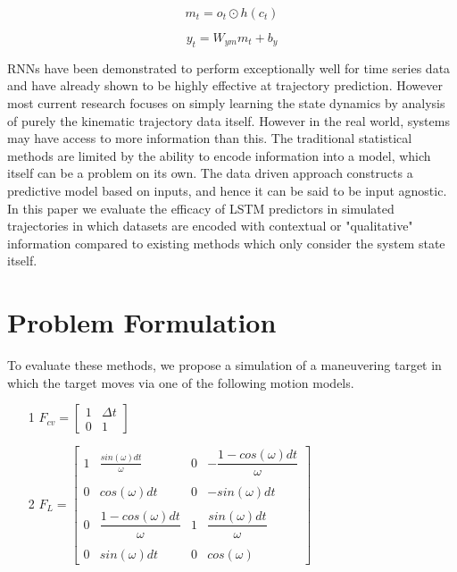 \documentclass[twocolumn,letterpaper]{IEEEAerospaceCLS}  %
\begin{document}
\begin{equation}
m_t = o_t \odot h (c_t)
\end{equation}

\begin{equation}
y_t = W_{ym} m_t +b_y
\end{equation}

	RNNs have been demonstrated to perform exceptionally well for time series data and have already shown to be highly effective at trajectory prediction. However most current research focuses on simply learning the state dynamics by analysis of purely the kinematic trajectory data itself. However in the real world, systems may have access to more information than this. The traditional statistical methods are limited by the ability to encode information into a model, which itself can be a problem on its own. The data driven approach constructs a predictive model based on inputs, and hence it can be said to be input agnostic. In this paper we evaluate the efficacy of LSTM predictors in simulated trajectories in which datasets are encoded with contextual or "qualitative" information compared to existing methods which only consider the system state itself.
	



\section{Problem Formulation}
To evaluate these methods, we propose a simulation of a maneuvering target in which the target moves via one of the following motion models.
\begin{enumerate}
\item[1] $F_{cv} = \begin{bmatrix}
1 & \Delta t \\
0 & 1
\end{bmatrix}$
\item[2] $F_{L} = \begin{bmatrix}
1 & \tfrac{sin(\omega) dt}{\omega} & 0 & -\dfrac{1-cos(\omega)dt}{\omega} \\ \\
0 & cos(\omega) dt & 0 & -sin(\omega)dt \\ \\
0 & \dfrac{1-cos(\omega) dt}{\omega}& 1 & \dfrac{ sin(\omega)dt}{\omega} \\ \\
0 & sin(\omega)dt & 0 & cos(\omega)
\end{bmatrix}$ 
\end{enumerate}
\end{document}
